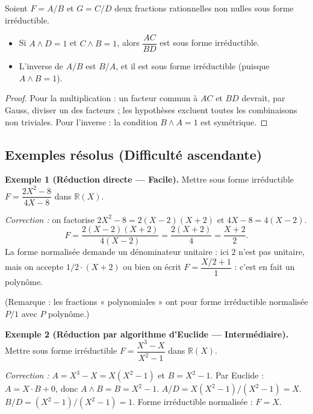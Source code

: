 \begin{proposition}
Soient $F = A/B$ et $G = C/D$ deux fractions rationnelles non nulles sous forme irréductible.
\begin{itemize}
    \item Si $A \wedge D = 1$ et $C \wedge B = 1$, alors $\dfrac{AC}{BD}$ est sous forme irréductible.
    \item L'inverse de $A/B$ est $B/A$, et il est sous forme irréductible (puisque $A \wedge B = 1$).
\end{itemize}
\end{proposition}

\begin{proof}
Pour la multiplication : un facteur commun à $AC$ et $BD$ devrait, par Gauss, diviser un des facteurs ; les hypothèses excluent toutes les combinaisons non triviales. Pour l'inverse : la condition $B \wedge A = 1$ est symétrique.
\end{proof}

\subsection{Exemples résolus (Difficulté ascendante)}

\textbf{Exemple 1 (Réduction directe --- Facile).}
Mettre sous forme irréductible $F = \dfrac{2X^2 - 8}{4X - 8}$ dans $\mathbb{R}(X)$.

\textit{Correction :} on factorise $2X^2 - 8 = 2(X - 2)(X + 2)$ et $4X - 8 = 4(X - 2)$.
\[ F = \frac{2(X - 2)(X + 2)}{4(X - 2)} = \frac{2(X + 2)}{4} = \frac{X + 2}{2}. \]
La forme normalisée demande un dénominateur unitaire : ici $2$ n'est pas unitaire, mais on accepte $1/2 \cdot (X + 2)$ ou bien on écrit $F = \dfrac{X/2 + 1}{1}$ : c'est en fait un polynôme.

(Remarque : les fractions « polynomiales » ont pour forme irréductible normalisée $P/1$ avec $P$ polynôme.)

\medskip

\textbf{Exemple 2 (Réduction par algorithme d'Euclide --- Intermédiaire).}
Mettre sous forme irréductible $F = \dfrac{X^3 - X}{X^2 - 1}$ dans $\mathbb{R}(X)$.

\textit{Correction :}
$A = X^3 - X = X(X^2 - 1)$ et $B = X^2 - 1$. Par Euclide : $A = X \cdot B + 0$, donc $A \wedge B = B = X^2 - 1$.
$A / D = X(X^2 - 1)/(X^2 - 1) = X$.
$B / D = (X^2 - 1)/(X^2 - 1) = 1$.
Forme irréductible normalisée : $F = X$.

\medskip

